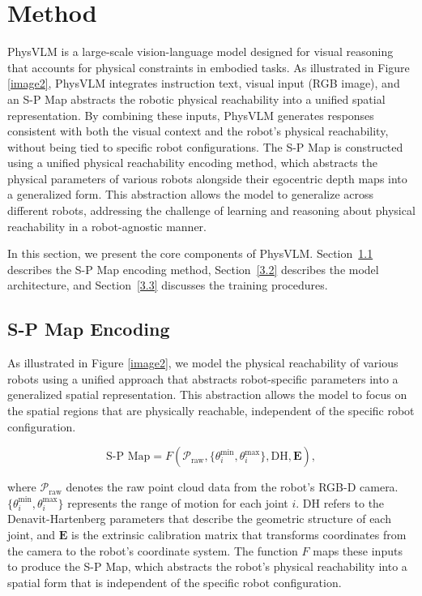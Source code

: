 \documentclass[10pt,twocolumn,letterpaper]{article}
\begin{document}
\section{Method}
\label{3}

PhysVLM is a large-scale vision-language model designed for visual reasoning that accounts for physical constraints in embodied tasks. As illustrated in Figure \ref{image2}, PhysVLM integrates instruction text, visual input (RGB image), and an S-P Map abstracts the robotic physical reachability into a unified spatial representation. By combining these inputs, PhysVLM generates responses consistent with both the visual context and the robot's physical reachability, without being tied to specific robot configurations. The S-P Map is constructed using a unified physical reachability encoding method, which abstracts the physical parameters of various robots alongside their egocentric depth maps into a generalized form. This abstraction allows the model to generalize across different robots, addressing the challenge of learning and reasoning about physical reachability in a robot-agnostic manner.

In this section, we present the core components of PhysVLM. Section~\ref{3.1} describes the S-P Map encoding method, Section~\ref{3.2} describes the model architecture, and Section~\ref{3.3} discusses the training procedures.


\subsection{S-P Map Encoding}
\label{3.1}

As illustrated in Figure \ref{image2}, we model the physical reachability of various robots using a unified approach that abstracts robot-specific parameters into a generalized spatial representation. This abstraction allows the model to focus on the spatial regions that are physically reachable, independent of the specific robot configuration.

\begin{equation}
\text{S-P Map} = F\left( \mathcal{P}_{\text{raw}}, \{\theta_i^{\text{min}}, \theta_i^{\text{max}}\}, \text{DH}, \mathbf{E} \right),
\end{equation}

where $\mathcal{P}_{\text{raw}}$ denotes the raw point cloud data from the robot's RGB-D camera. $\{\theta_i^{\text{min}}, \theta_i^{\text{max}}\}$ represents the range of motion for each joint $i$. $\text{DH}$ refers to the Denavit-Hartenberg parameters that describe the geometric structure of each joint, and $\mathbf{E}$ is the extrinsic calibration matrix that transforms coordinates from the camera to the robot's coordinate system. The function $F$ maps these inputs to produce the S-P Map, which abstracts the robot's physical reachability into a spatial form that is independent of the specific robot configuration.
\end{document}
